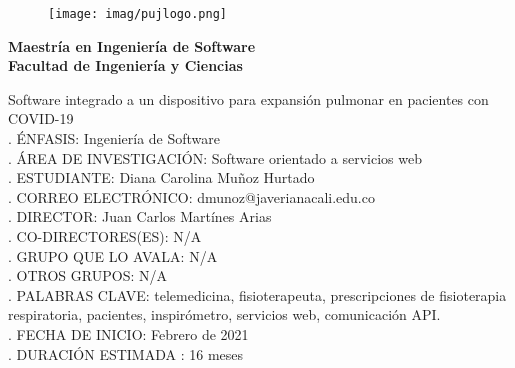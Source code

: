

\thispagestyle{empty}
\begin{figure}
\raggedleft  
\texttt{[image: imag/pujlogo.png]}\par\vspace{1cm}
\end{figure}


\begin{flushleft}
  \raggedleft \textbf{Maestría en Ingeniería de Software} \\
  \raggedleft \textbf{Facultad de Ingeniería y Ciencias} 
\end{flushleft}




\vspace{1.5cm}

\begin{center}
\end{center}
\vspace{1.5cm}

 Software integrado a un dispositivo para expansi\'on pulmonar en pacientes con COVID-19\\

. \'ENFASIS: Ingeniería de Software \\
. ÁREA DE INVESTIGACIÓN: Software orientado a servicios web\\
. ESTUDIANTE: Diana Carolina Mu\~{n}oz Hurtado \\
. CORREO ELECTR\'ONICO: dmunoz@javerianacali.edu.co\\
. DIRECTOR: Juan Carlos Mart\'ines Arias\\
. CO-DIRECTORES(ES): N/A\\
. GRUPO QUE LO AVALA: N/A \\
. OTROS GRUPOS: N/A\\
. PALABRAS CLAVE: telemedicina, fisioterapeuta, prescripciones de fisioterapia respiratoria, pacientes, inspir\'ometro, servicios web, comunicación API.\\
. FECHA DE INICIO: Febrero de 2021\\
. DURACI\'ON ESTIMADA : 16 meses\\
